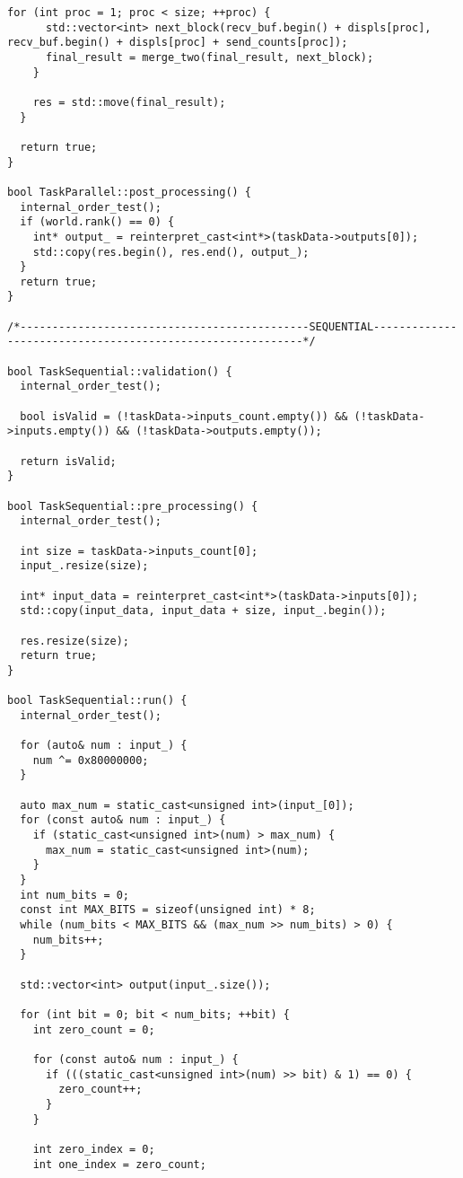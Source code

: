 \documentclass[12pt]{article}
\begin{document}
\begin{lstlisting}[caption={Параллельная версия поразрядной сортировки с использованием MPI}]
    for (int proc = 1; proc < size; ++proc) {
      std::vector<int> next_block(recv_buf.begin() + displs[proc], recv_buf.begin() + displs[proc] + send_counts[proc]);
      final_result = merge_two(final_result, next_block);
    }

    res = std::move(final_result);
  }

  return true;
}

bool TaskParallel::post_processing() {
  internal_order_test();
  if (world.rank() == 0) {
    int* output_ = reinterpret_cast<int*>(taskData->outputs[0]);
    std::copy(res.begin(), res.end(), output_);
  }
  return true;
}

/*---------------------------------------------SEQUENTIAL-----------------------------------------------------------*/

bool TaskSequential::validation() {
  internal_order_test();

  bool isValid = (!taskData->inputs_count.empty()) && (!taskData->inputs.empty()) && (!taskData->outputs.empty());

  return isValid;
}

bool TaskSequential::pre_processing() {
  internal_order_test();

  int size = taskData->inputs_count[0];
  input_.resize(size);

  int* input_data = reinterpret_cast<int*>(taskData->inputs[0]);
  std::copy(input_data, input_data + size, input_.begin());

  res.resize(size);
  return true;
}

bool TaskSequential::run() {
  internal_order_test();

  for (auto& num : input_) {
    num ^= 0x80000000;
  }

  auto max_num = static_cast<unsigned int>(input_[0]);
  for (const auto& num : input_) {
    if (static_cast<unsigned int>(num) > max_num) {
      max_num = static_cast<unsigned int>(num);
    }
  }
  int num_bits = 0;
  const int MAX_BITS = sizeof(unsigned int) * 8;
  while (num_bits < MAX_BITS && (max_num >> num_bits) > 0) {
    num_bits++;
  }

  std::vector<int> output(input_.size());

  for (int bit = 0; bit < num_bits; ++bit) {
    int zero_count = 0;

    for (const auto& num : input_) {
      if (((static_cast<unsigned int>(num) >> bit) & 1) == 0) {
        zero_count++;
      }
    }

    int zero_index = 0;
    int one_index = zero_count;


\end{lstlisting}
\end{document}
